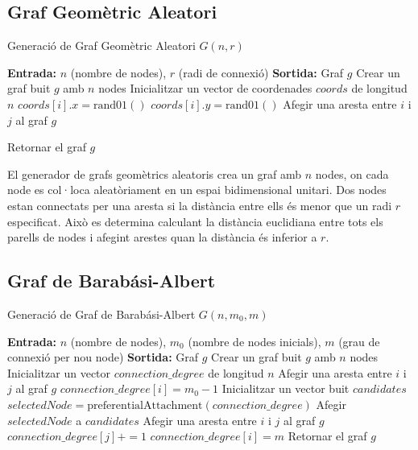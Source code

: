 \documentclass[a4paper]{article}
\begin{document}
	\subsection{Graf Geomètric Aleatori}
	\begin{algorithm} [H]
		\caption{Generació de Graf Geomètric Aleatori $G(n, r)$}
		\begin{algorithmic} [1]
			\Statex \textbf{Entrada:} $n$ (nombre de nodes), $r$ (radi de connexió)
			\Statex \textbf{Sortida:} Graf $g$
			\Statex \vspace{-0.25em}
			\State Crear un graf buit $g$ amb $n$ nodes
			\State Inicialitzar un vector de coordenades $coords$ de longitud $n$
				\State $coords[i].x = \text{rand01}()$
				\State $coords[i].y = \text{rand01}()$
			\EndFor
						\State Afegir una aresta entre $i$ i $j$ al graf $g$
					\EndIf

				\EndFor
			\EndFor
			\State Retornar el graf $g$
		\end{algorithmic}
	\end{algorithm}
	El generador de grafs geomètrics aleatoris crea un graf amb $n$ nodes, on cada node es col·loca aleatòriament en un espai bidimensional unitari. Dos nodes estan connectats per una aresta si la distància entre ells és menor que un radi $r$ especificat. Això es determina calculant la distància euclidiana entre tots els parells de nodes i afegint arestes quan la distància és inferior a $r$.
		
	\subsection{Graf de Barabási-Albert}

	\begin{algorithm} [H]
		\caption{Generació de Graf de Barabási-Albert $G(n, m_0, m)$}
		\begin{algorithmic} [1]
			\Statex \textbf{Entrada:} $n$ (nombre de nodes), $m_0$ (nombre de nodes inicials), $m$ (grau de connexió per nou node)
			\Statex \textbf{Sortida:} Graf $g$
			\Statex \vspace{-0.25em}
			\State Crear un graf buit $g$ amb $n$ nodes
			\State Inicialitzar un vector $connection\_degree$ de longitud $n$
					\State Afegir una aresta entre $i$ i $j$ al graf $g$
				\EndFor
				\State $connection\_degree[i] = m_0 - 1$
			\EndFor
				\State Inicialitzar un vector buit $candidates$
					\State $selectedNode = \text{preferentialAttachment}(connection\_degree)$
						\State Afegir $selectedNode$ a $candidates$
					\EndIf
				\EndWhile
					\State Afegir una aresta entre $i$ i $j$ al graf $g$
					\State $connection\_degree[j] += 1$
				\EndFor
				\State $connection\_degree[i] = m$
			\EndFor
			\State Retornar el graf $g$
		\end{algorithmic}
	\end{algorithm}
	
\end{document}
